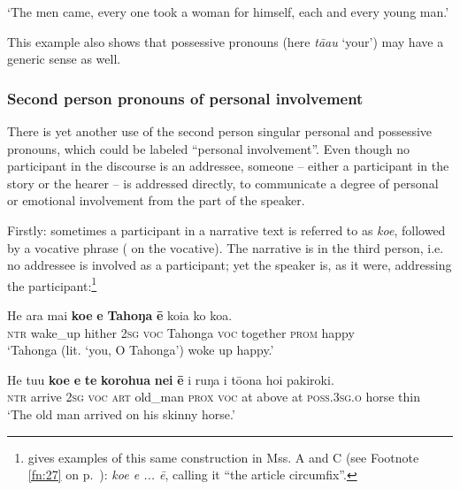 \glt
‘The men came, every one took a woman for himself, each and every young man.’ \textstyleExampleref{[Mtx-3-01.285]}
\z

This example also shows that possessive pronouns (here \textit{tā{\ꞌ}au} ‘your’) may have a generic sense as well. 

\subsubsection[Second person pronouns of personal involvement]{Second person pronouns of personal involvement}\label{sec:4.2.4.2}

There is yet another use of the second person singular personal and possessive pronouns, which could be labeled “personal involvement”. Even though no participant in the discourse is an addressee, someone – either a participant in the story or the hearer – is addressed directly, to communicate a degree of personal or emotional involvement from the part of the speaker.

Firstly: sometimes a participant in a narrative text is referred to as \textit{koe}, followed by a vocative phrase ( on the vocative). The narrative is in the third person, i.e. no addressee is involved as a participant; yet the speaker is, as it were, addressing the participant:\footnote{\label{fn:165}\citet[400]{Fedorova1965} gives examples of this same construction in Mss. A and C (see Footnote \ref{fn:27} on p.~\pageref{fn:27}): \textit{koe e ... ē}, calling it “the article circumfix”.}

\ea\label{ex:4.6}
\gll He {\ꞌ}ara mai \textbf{koe} \textbf{e} \textbf{Tahoŋa} \textbf{ē} koia ko koa. \\
\textsc{ntr} wake\_up hither \textsc{2sg} \textsc{voc} Tahonga \textsc{voc} together \textsc{prom} happy \\

\glt 
‘Tahonga (lit. ‘you, O Tahonga’) woke up happy.’ \textstyleExampleref{[R301.351]} 
\z

\ea\label{ex:4.7}
\gll He tu{\ꞌ}u \textbf{koe} \textbf{e} \textbf{te} \textbf{korohu{\ꞌ}a} \textbf{nei} \textbf{ē} {\ꞌ}i ruŋa i tō{\ꞌ}ona hoi pakiroki. \\
\textsc{ntr} arrive \textsc{2sg} \textsc{voc} \textsc{art} old\_man \textsc{prox} \textsc{voc} at above at \textsc{poss.3sg.o} horse thin \\

\glt
‘The old man arrived on his skinny horse.’ \textstyleExampleref{[R363.017]} 
\z

